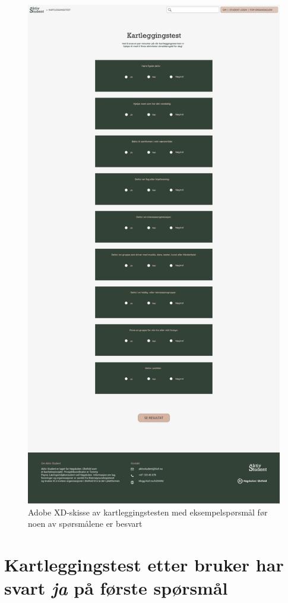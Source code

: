 \begin{figure}[H]
\centering
\includegraphics[width=.6\textwidth]{Illustrasjoner/Skisser-pdf/3.0/3-12-kartleggingstest.pdf}
\caption{Adobe XD-skisse av kartleggingstesten med eksempelspørsmål før noen av spørsmålene er besvart}
\label{vedlegg:3-12-kartlegging}
\end{figure}

\section{Kartleggingstest etter bruker har svart {\em ja} på første spørsmål}

